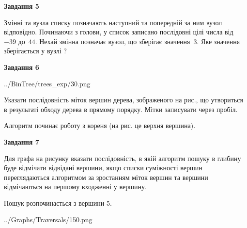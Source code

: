 \documentclass[12pt, ukrainian]{article}
\begin{document}
{\begin {large}
{\begin {center}\textbf{Завдання 5}\end {center}}\par
Змінні  та  вузла списку позначають наступний та попередній за ним вузол відповідно. Починаючи з голови, у список записано послідовні цілі числа від~$-39$ до~$44$. Нехай змінна  позначає вузол, що зберігає значення~$3$.
Яке значення зберігається у вузлі  ?\par
\newpage

{\begin {center}\textbf{Завдання 6}\end {center}}\par

\begin{center}
	{../BinTree/trees_exp/30.png}
\end{center}
Указати послідовність міток вершин дерева, зображеного на рис., що утвориться в результаті обходу дерева в прямому порядку. Мітки записувати через пробіл.\par Алгоритм починає роботу з кореня (на рис. це верхня вершина).\par
\newpage

{\begin {center}\textbf{Завдання 7}\end {center}}\par
Для графа на рисунку вказати послідовність, в якій алгоритм пошуку в глибину буде відмічати відвідані вершини, якщо списки суміжності вершин переглядаються алгоритмом за зростанням міток вершин та вершини відмічаються на першому вход\-женні у вершину.\par
Пошук розпочинається з вершини 5.\par

\begin{center}
	{../Graphs/Traversals/150.png}
\end{center}\par
\newpage


\end{large}}
\end{document}
